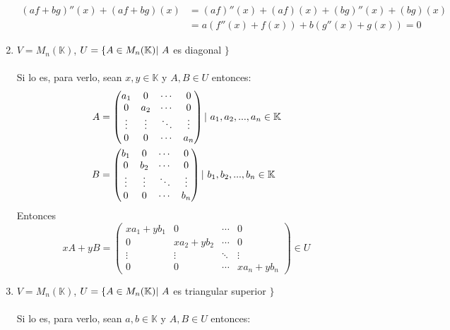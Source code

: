 \begin{ejercicio}
\begin{enumerate}[label=\alph*)]
		      \begin{align*}
			      (af + bg)''(x) + (af + bg)(x) & = (af)''(x) + (af)(x) + (bg)''(x) + (bg)(x) \\&= a(f''(x) + f(x)) + b(g''(x) + g(x)) = 0
		      \end{align*}
		\item $V = M_n(\mathbb{K})$, $U = \{ A \in M_n(\mathbb{K}) \arrowvert \ A $ es diagonal $\}$
		      \\ \\Si lo es, para verlo, sean $x,y \in \mathbb{K}$ y $A,B \in U$ entonces:
		      \begin{align*}
			      A & = \begin{pmatrix}
				            a_1    & 0      & \cdots & 0      \\
				            0      & a_2    & \cdots & 0      \\
				            \vdots & \vdots & \ddots & \vdots \\
				            0      & 0      & \cdots & a_n
			            \end{pmatrix} \arrowvert \ a_1,a_2,...,a_n \in \mathbb{K}
			      \\ B &=\begin{pmatrix}
				      b_1    & 0      & \cdots & 0      \\
				      0      & b_2    & \cdots & 0      \\
				      \vdots & \vdots & \ddots & \vdots \\
				      0      & 0      & \cdots & b_n
			      \end{pmatrix} \arrowvert \ b_1,b_2,...,b_n \in \mathbb{K}
		      \end{align*}
		      Entonces
		      \begin{equation*}
			      xA + yB = \begin{pmatrix}
				      xa_1 + yb_1 & 0           & \cdots & 0           \\
				      0           & xa_2 + yb_2 & \cdots & 0           \\
				      \vdots      & \vdots      & \ddots & \vdots      \\
				      0           & 0           & \cdots & xa_n + yb_n
			      \end{pmatrix} \in U
		      \end{equation*}
		\item $V = M_n(\mathbb{K})$, $U = \{ A \in M_n(\mathbb{K}) \arrowvert \ A $ es triangular superior $\}$
		      \\ \\ Si lo es, para verlo, sean $a,b \in \mathbb{K}$ y $A,B \in U$ entonces:

\end{enumerate}
\end{ejercicio}
